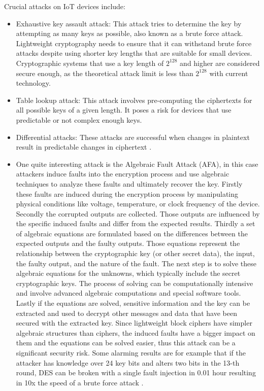 \documentclass[a4paper,11pt, twoside]{article}
\begin{document}
Crucial attacks on IoT devices include:

\begin{itemize}
    \item Exhaustive key assault attack: This attack tries to determine the key by attempting as many keys as possible, also known as a brute force attack. Lightweight cryptography needs to ensure that it can withstand brute force attacks despite using shorter key lengths that are suitable for small devices. Cryptographic systems that use a key length of $2^{128}$ and higher are considered secure enough, as the theoretical attack limit is less than $2^{128}$ with current technology.
    \item Table lookup attack: This attack involves pre-computing the ciphertexts for all possible keys of a given length. It poses a risk for devices that use predictable or not complex enough keys.
    \item Differential attacks: These attacks are successful when changes in plaintext result in predictable changes in ciphertext \cite{ekwueme2024lightweight}.
    \item One quite interesting attack is the Algebraic Fault Attack (AFA), in this case attackers induce faults into the encryption process and use algebraic techniques to analyze these faults and ultimately recover the key. Firstly these faults are induced during the encryption process by manipulating physical conditions like voltage, temperature, or clock frequency of the device. Secondly the corrupted outputs are collected. Those outputs are influenced by the specific induced faults and differ from the expected results. Thirdly a set of algebraic equations are formulated based on the differences between the expected outputs and the faulty outputs. Those equations represent the relationship between the cryptographic key (or other secret data), the input, the faulty output, and the nature of the fault. The next step is to solve these algebraic equations for the unknowns, which typically include the secret cryptographic keys. The process of solving can be computationally intensive and involve advanced algebraic computations and special software tools. Lastly if the equations are solved, sensitive information and the key can be extracted and used to decrypt other messages and data that have been secured with the extracted key. Since lightweight block ciphers have simpler algebraic structures than ciphers, the induced faults have a bigger impact on them and the equations can be solved easier, thus this attack can be a significant security risk. Some alarming results are for example that if the attacker has knowledge over 24 key bits and alters two bits in the 13-th round, DES can be broken with a single fault injection in 0.01 hour resulting in 10x the speed of a brute force attack \cite{zhang2016framework}.

\end{itemize}
\end{document}
